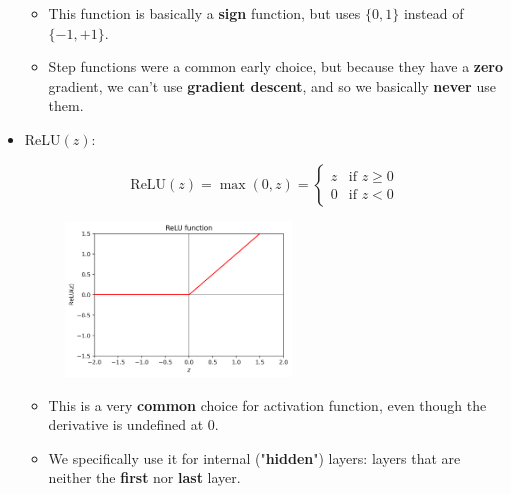 \begin{itemize}
                \begin{itemize}
                    \item This function is basically a \textbf{sign} function, but uses $\{0, 1\}$ instead of $\{-1, +1\}$.
                    
                    \item Step functions were a common early choice, but because they have a \textbf{zero} gradient, we can't use \textbf{gradient descent}, and so we basically \textbf{never} use them.
                \end{itemize}
            
            
            \item {} ReLU$(z)$:
            
                \begin{equation}
                    \text{ReLU}(z) 
                    =
                    \max(0,z)
                    =
                    \begin{cases}
                      z & \text{if $z \geq 0$}\\
                      0 & \text{if $z < 0$}
                    \end{cases}
                \end{equation}
                
                \begin{figure}[H]
                    \centering
                    \includegraphics[width=60mm,scale=0.4]{images/nn_images/relu_fn.png}
                \end{figure}
                
                \begin{itemize}
                    \item This is a very \textbf{common} choice for activation function, even though the derivative is undefined at 0.
                    
                    \item We specifically use it for internal ("\textbf{hidden}") layers: layers that are neither the \textbf{first} nor \textbf{last} layer.
                \end{itemize}
            

\end{itemize}
